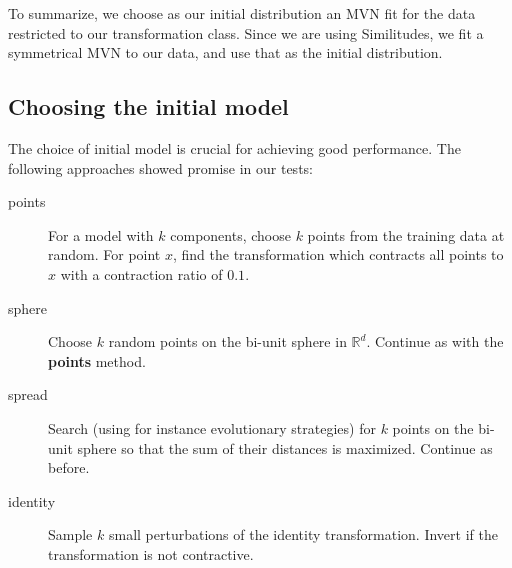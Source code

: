 \documentclass[10pt,a4paper,oneside]{article}
\theoremstyle{definition}
\begin{document}
To summarize, we choose as our initial distribution an MVN fit for the data restricted to our transformation class. Since we are using Similitudes, we fit a symmetrical MVN to our data, and use that as the initial distribution.






\subsection*{Choosing the initial model}

The choice of initial model is crucial for achieving good performance. The following approaches showed promise in our tests:

\begin{description}
  \item[points] For a model with $k$ components, choose $k$ points from the training data at random. For point $x$, find the transformation which contracts all points to $x$ with a contraction ratio of $0.1$.
  \item[sphere] Choose $k$ random points on the bi-unit sphere in ${\mathbb R}^d$. Continue as with the \textbf{points} method.
  \item[spread] Search (using for instance evolutionary strategies) for $k$ points on the bi-unit sphere so that the sum of their distances is maximized. Continue as before.
  \item[identity] Sample $k$ small perturbations of the identity transformation. Invert if the transformation is not contractive. 
\end{description}
\end{document}

